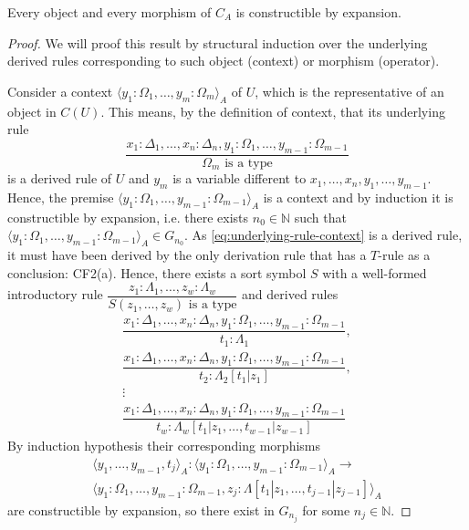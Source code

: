 \begin{theorem}
    Every object and every morphism of $C_A$ is constructible by expansion.
\end{theorem}
\begin{proof}
    We will proof this result by structural induction 
    over the underlying derived rules corresponding to 
    such object (context) or morphism (operator).

    Consider a context 
    $\langle y_1 : \Omega_1, \dots, y_m : \Omega_m \rangle_A$
    of $U$, which is the representative of an object in $C(U)$.
    This means, by the definition of context, that its underlying rule 
    \begin{equation}
        \dfrac{
            x_1 : \Delta_1, \dots, x_n : \Delta_n, 
            y_1 : \Omega_1, \dots, y_{m-1} : \Omega_{m-1}
        }{
            \Omega_m \text{ is a type}
        } \label{eq:underlying-rule-context}
    \end{equation}
    is a derived rule of $U$ and $y_m$ is a variable different to $x_1, \dots, x_n, y_1, \dots, y_{m-1}$.
    Hence, the premise $\langle y_1 : \Omega_1, \dots, y_{m-1} : \Omega_{m-1} \rangle_A$
    is a context and by induction it is constructible by
    expansion, i.e. there exists $n_0 \in \mathbb{N}$ such that
    $\langle y_1 : \Omega_1, \dots, y_{m-1} : \Omega_{m-1} \rangle_A \in G_{n_0}$.
    As \eqref{eq:underlying-rule-context} is a derived rule,
    it must have been derived by the only derivation rule that
    has a $T$-rule as a conclusion: CF2(a).
    Hence, there exists a sort symbol $S$ with a well-formed
    introductory rule \(
        \dfrac{
            z_1 : \Lambda_1, \dots, z_w : \Lambda_w
        }{
            S(z_1, \dots, z_w) \text{ is a type}
        }
    \) and derived rules
    \begin{align*}
        \dfrac{
            x_1 : \Delta_1, \dots, x_n : \Delta_n,
            y_1 : \Omega_1, \dots, y_{m-1} : \Omega_{m-1}
        }{
            t_1 : \Lambda_1
        }, \\
        \dfrac{
            x_1 : \Delta_1, \dots, x_n : \Delta_n,
            y_1 : \Omega_1, \dots, y_{m-1} : \Omega_{m-1}
        }{
            t_2 : \Lambda_2[t_1 | z_1]
        }, \\ \vdots \\ %
        \dfrac{
            x_1 : \Delta_1, \dots, x_n : \Delta_n,
            y_1 : \Omega_1, \dots, y_{m-1} : \Omega_{m-1}
        }{
            t_w : \Lambda_w[t_1 | z_1, \dots, t_{w-1} | z_{w-1}]
        }
    \end{align*}
    By induction hypothesis their corresponding morphisms
    \begin{multline*}
        \langle y_1, \dots, y_{m-1}, t_j \rangle_A
        : \langle y_1 : \Omega_1, \dots, y_{m-1} : \Omega_{m-1} \rangle_A
        \to \\ 
        \langle y_1 : \Omega_1, \dots, y_{m-1} : \Omega_{m-1}, z_j : \Lambda[t_1 | z_1, \dots, t_{j-1} | z_{j-1}] \rangle_A
    \end{multline*}
    are constructible by expansion, so there exist in $G_{n_j}$
    for some $n_j \in \mathbb{N}$.


\end{proof}
